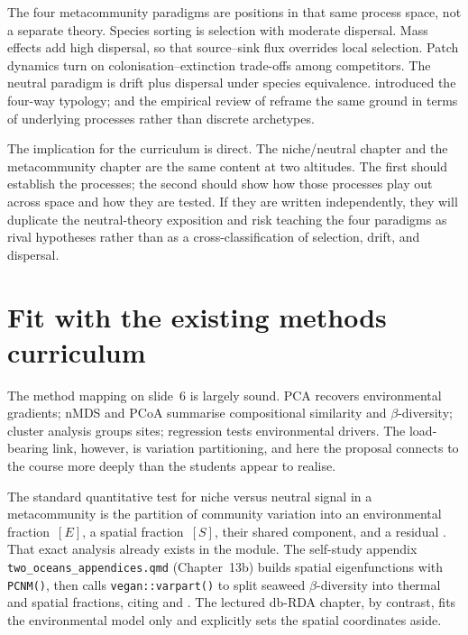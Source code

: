 \documentclass[11pt,a4paper]{article}
\newcommand{\fname}[1]{\texttt{\small #1}}
\begin{document}
The four metacommunity paradigms are positions in that same process space, not a separate
theory. Species sorting is selection with moderate dispersal. Mass effects add high
dispersal, so that source--sink flux overrides local selection. Patch dynamics turn on
colonisation--extinction trade-offs among competitors. The neutral paradigm is drift plus
dispersal under species equivalence. \citet{leibold2004} introduced the four-way typology;
\citet{leibold2018} and the empirical review of \citet{logue2011} reframe the same ground
in terms of underlying processes rather than discrete archetypes.

The implication for the curriculum is direct. The niche/neutral chapter and the
metacommunity chapter are the same content at two altitudes. The first should establish
the processes; the second should show how those processes play out across space and how
they are tested. If they are written independently, they will duplicate the neutral-theory
exposition and risk teaching the four paradigms as rival hypotheses rather than as a
cross-classification of selection, drift, and dispersal.

\section{Fit with the existing methods curriculum}

The method mapping on slide~6 is largely sound. PCA recovers environmental gradients; nMDS
and PCoA summarise compositional similarity and $\beta$-diversity; cluster analysis groups
sites; regression tests environmental drivers. The load-bearing link, however, is
variation partitioning, and here the proposal connects to the course more deeply than the
students appear to realise.

The standard quantitative test for niche versus neutral signal in a metacommunity is the
partition of community variation into an environmental fraction~$[E]$, a spatial
fraction~$[S]$, their shared component, and a residual \citep{borcard1992,
peresneto2006, cottenie2005}. That exact analysis already exists in the module. The
self-study appendix \fname{two\_oceans\_appendices.qmd} (Chapter~13b) builds spatial
eigenfunctions with \fname{PCNM()}, then calls \fname{vegan::varpart()} to split seaweed
$\beta$-diversity into thermal and spatial fractions, citing \citet{peresneto2006} and
\citet{peresneto2010}. The lectured db-RDA chapter, by contrast, fits the environmental
model only and explicitly sets the spatial coordinates aside.
\end{document}

